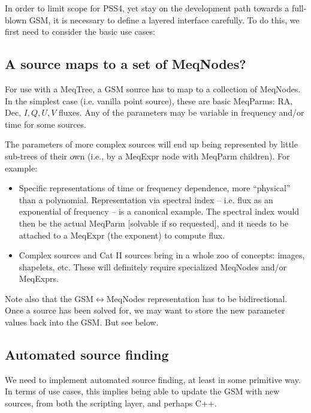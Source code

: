 \documentclass[10pt]{article}
\begin{document}
In order to limit scope for PSS4, yet stay on the development path towards a
full-blown GSM, it is necessary to define a layered interface carefully. To do
this, we first need to consider the basic use cases:

  \subsection{A source maps to a set of MeqNodes?} 

For use with a MeqTree, a GSM source has to map to a collection of MeqNodes. In
the simplest case (i.e. vanilla point source), these are basic MeqParms: RA,
Dec, $I,Q,U,V$ fluxes. Any of the parameters may be variable in frequency
and/or time for some sources.

The parameters of more complex sources will end up being represented by little
sub-trees of their own (i.e., by a MeqExpr node with MeqParm children). For
example:

\begin{itemize}

\item Specific representations of time or frequency dependence, more
``physical'' than a polynomial. Representation via spectral index -- i.e. flux
as an exponential of frequency -- is a canonical example. The spectral index
would then be the actual MeqParm [solvable if so requested], and it needs to be
attached to a MeqExpr (the exponent) to compute flux.

\item Complex sources and Cat II sources bring in a whole zoo of concepts:
images, shapelets, etc. These will definitely require specialized MeqNodes
and/or MeqExprs. 

\end{itemize}

Note also that the GSM$\leftrightarrow$MeqNodes representation has to be
bidirectional. Once a source has been solved for, we may want to store the new
parameter values back into the GSM. But see below.

  \subsection{Automated source finding}

We need to implement automated source finding, at least in some primitive way. 
In terms of use cases, this implies being able to update the GSM with new
sources, from both the scripting layer, and perhaps C++. 
\end{document}
